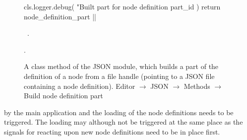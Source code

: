 \documentclass[%
    a4paper,    %
    justified,  %
    nobib,      %
    openany     %
]{tufte-book}
\makeatletter
\renewcommand{\label}[1]{\@tufte@label{##1}}%
\makeatother
\begin{document}
\begin{figure}
\begin{flushleft}
\begin{minipage}{\linewidth}
\begin{pythoncode}
    cls.logger.debug(
        "Built part for node definition %
        part_id
    )
    return node_definition_part
|\NWsep|
\end{pythoncode}
\vspace{1.5ex}
\footnotesize
\begin{list}{}{\setlength{\itemsep}{-\parsep}\setlength{\itemindent}{-\leftmargin}}
\item \NWtxtMacroDefBy\ .
\item {\NWtxtMacroNoRef}.

\item{}
\end{list}
\end{minipage}\vspace{4ex}
\end{flushleft}
\caption{A class method of the JSON module, which builds a part of the
  definition of a node from a file handle (pointing to a JSON file containing a
  node definition).
  \newline{}\newline{}Editor $\rightarrow$ JSON $\rightarrow$
  Methods $\rightarrow$ Build node definition part}
\label{editor:lst:json:methods:build-node-definition-part}
\end{figure}

 by the main
application and the loading of the node definitions needs to be triggered. The
loading may although not be triggered at the same place as the signals for
reacting upon new node definitions need to be in place first.
\end{document}
